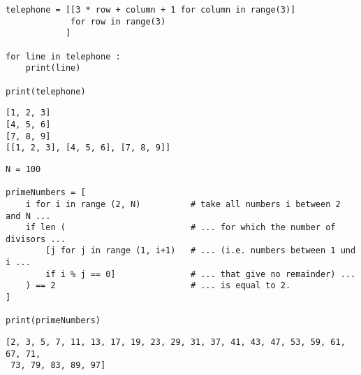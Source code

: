 
\begin{frame}[fragile]
%
\begin{codebox}
\begin{verbatim}
telephone = [[3 * row + column + 1 for column in range(3)]
             for row in range(3)
            ]

for line in telephone :
    print(line)

print(telephone)
\end{verbatim}
\end{codebox}
%
\begin{cmdbox}
\begin{verbatim}
[1, 2, 3]
[4, 5, 6]
[7, 8, 9]
[[1, 2, 3], [4, 5, 6], [7, 8, 9]]
\end{verbatim}
\end{cmdbox}
%
\end{frame}


\begin{frame}[fragile]
%
\begin{codebox}
\begin{verbatim}
N = 100

primeNumbers = [
    i for i in range (2, N)          # take all numbers i between 2 and N ...
    if len (                         # ... for which the number of divisors ...
        [j for j in range (1, i+1)   # ... (i.e. numbers between 1 und i ...
        if i % j == 0]               # ... that give no remainder) ...
    ) == 2                           # ... is equal to 2.
]

print(primeNumbers)

\end{verbatim}
\end{codebox}
%
\begin{cmdbox}
\begin{verbatim}
[2, 3, 5, 7, 11, 13, 17, 19, 23, 29, 31, 37, 41, 43, 47, 53, 59, 61, 67, 71,
 73, 79, 83, 89, 97]
\end{verbatim}
\end{cmdbox}
%
\end{frame}

